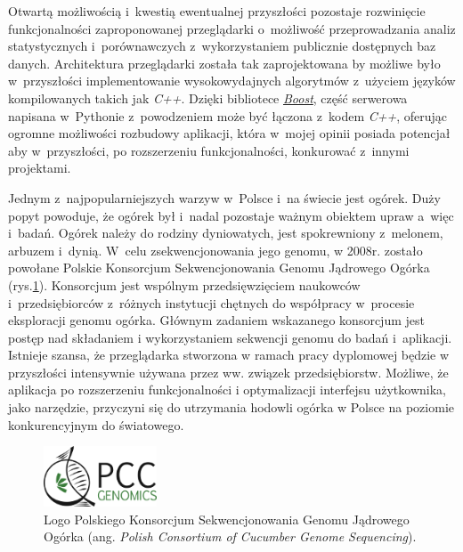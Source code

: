 \documentclass[a4paper,12pt,oneside]{mwrep}  %
\begin{document}
Otwartą możliwością i~kwestią ewentualnej przyszłości pozostaje rozwinięcie funkcjonalności zaproponowanej przeglądarki o~możliwość przeprowadzania analiz statystycznych i~porównawczych z~wykorzystaniem publicznie dostępnych baz danych. Architektura przeglądarki została tak zaprojektowana by możliwe było w~przyszłości implementowanie wysokowydajnych algorytmów z~użyciem języków kompilowanych takich jak \emph{C++}. Dzięki bibliotece \href{http://www.boost.org/}{\emph{Boost}}, część serwerowa napisana w~Pythonie z~powodzeniem może być łączona z~kodem \emph{C++}, oferując ogromne możliwości rozbudowy aplikacji, która w~mojej opinii posiada potencjał aby w~przyszłości, po rozszerzeniu funkcjonalności, konkurować z~innymi projektami.

Jednym z~najpopularniejszych warzyw w~Polsce i~na świecie jest ogórek. Duży popyt powoduje, że ogórek był i~nadal pozostaje ważnym obiektem upraw a~więc i~badań. Ogórek należy do rodziny dyniowatych, jest spokrewniony z~melonem, arbuzem i~dynią. W~celu zsekwencjonowania jego genomu, w 2008r. zostało powołane Polskie Konsorcjum Sekwencjonowania Genomu Jądrowego Ogórka (rys.\ref{konsorcjum}). Konsorcjum jest wspólnym przedsięwzięciem naukowców i~przedsiębiorców z~różnych instytucji chętnych do współpracy w~procesie eksploracji genomu ogórka. Głównym zadaniem wskazanego konsorcjum jest postęp nad składaniem i wykorzystaniem sekwencji genomu do badań i~aplikacji. Istnieje szansa, że przeglądarka stworzona w ramach pracy dyplomowej będzie w przyszłości intensywnie używana przez ww. związek przedsiębiorstw. Możliwe, że aplikacja po rozszerzeniu funkcjonalności i optymalizacji interfejsu użytkownika, jako narzędzie, przyczyni się do utrzymania hodowli ogórka w Polsce na poziomie konkurencyjnym do światowego.\cite{konsorcjium-pdf, pcc-genomics}

\begin{figure}[h]
\centering
\includegraphics[width=0.3\textwidth]{grafika/loga/konsorcjum.png}
\caption{Logo Polskiego Konsorcjum Sekwencjonowania Genomu Jądrowego Ogórka (ang. \emph{Polish Consortium of Cucumber Genome Sequencing}).}
\label{konsorcjum}
\end{figure}
\end{document}
